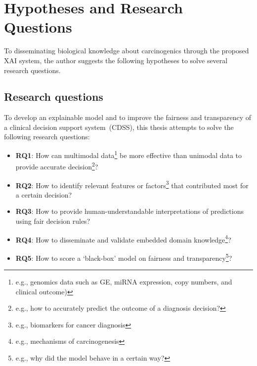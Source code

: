 \section{Hypotheses and Research Questions} \label{hypotheses}
To disseminating biological knowledge about carcinogenics through the proposed XAI system, the author suggests the following hypotheses to solve several research questions.  

\subsection{Research questions}
To develop an explainable model and to improve the fairness and transparency of a clinical decision support system~(CDSS), this thesis attempts to solve the following research questions: 

\vspace{-2mm}
\begin{itemize}[noitemsep]
    \item \textbf{RQ1}: How can multimodal data\footnote{e.g., genomics data such as GE, miRNA expression, copy numbers, and clinical outcome)} be more effective than unimodal data to provide accurate decision\footnote{e.g., how to accurately predict the outcome of a diagnosis decision?}? 
    \item \textbf{RQ2}: How to identify relevant features or factors\footnote{e.g., biomarkers for cancer diagnosis} that contributed most for a certain decision? 
    \item \textbf{RQ3}: How to provide human-understandable interpretations of predictions using fair decision rules? 
    \item \textbf{RQ4}: How to disseminate and validate embedded domain knowledge\footnote{e.g., mechanisms of carcinogenesis}?
    \item \textbf{RQ5}: How to score a `black-box' model on fairness and transparency\footnote{e.g., why did the model behave in a certain way?}? 
\end{itemize}
\vspace{-2mm}


